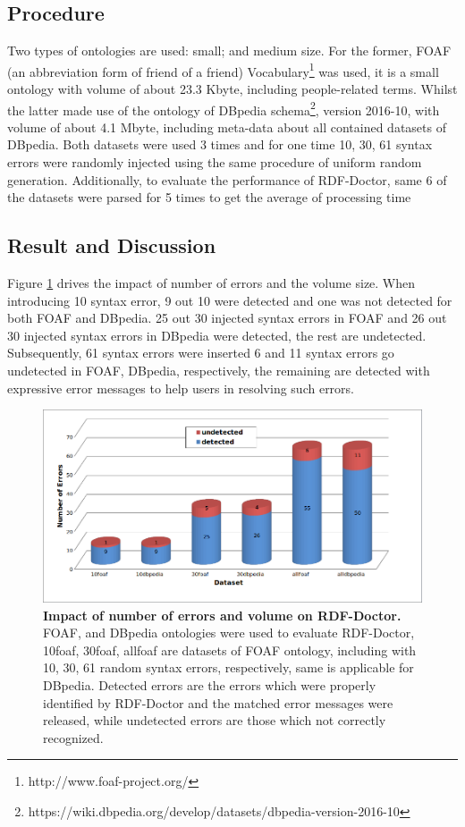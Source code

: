 \subsection{Procedure}
Two types of ontologies are used: small; and medium size. For the former, FOAF  (an abbreviation form of friend of a friend) Vocabulary\footnote{http://www.foaf-project.org/} was used, it is a small ontology with volume of about 23.3 Kbyte, including people-related terms. Whilst the latter made use of the ontology  of DBpedia schema\footnote{https://wiki.dbpedia.org/develop/datasets/dbpedia-version-2016-10}, version 2016-10, with volume of about 4.1 Mbyte, including meta-data about all contained datasets of DBpedia. Both datasets were used 3 times and for one time 10, 30, 61 syntax errors were randomly  injected using the same procedure of uniform random generation. Additionally, to evaluate the performance of RDF-Doctor, same 6 of the datasets were parsed for 5 times to get the average of processing time  

 
\subsection{Result and Discussion}
Figure \ref{Fig:Experiment03-01} drives the impact of number of errors and the volume size. When introducing 10 syntax error, 9 out 10 were detected and one was not detected for both FOAF and DBpedia. 25 out 30 injected syntax errors in FOAF and 26 out 30 injected syntax errors in DBpedia were detected, the rest are undetected. Subsequently, 61 syntax errors were inserted 6 and 11 syntax errors go undetected in FOAF, DBpedia, respectively, the remaining are detected with expressive error messages to help users in resolving such errors. 
\begin{figure}[ht]
\begin{center}
		\includegraphics[scale=0.49,angle=0]{images/Experiment03-01.png}
				\setlength\belowcaptionskip{-5mm}

		\caption{\textbf{Impact of number of errors and volume on RDF-Doctor.} FOAF, and DBpedia ontologies were used to evaluate RDF-Doctor, 10foaf, 30foaf, allfoaf are datasets of FOAF ontology, including with 10, 30, 61 random syntax errors, respectively, same is applicable for DBpedia. Detected errors are the errors which were properly identified by RDF-Doctor and the matched error messages were released, while undetected errors are those which not correctly recognized.}
		\label{Fig:Experiment03-01}

\end{center}
\end{figure}


